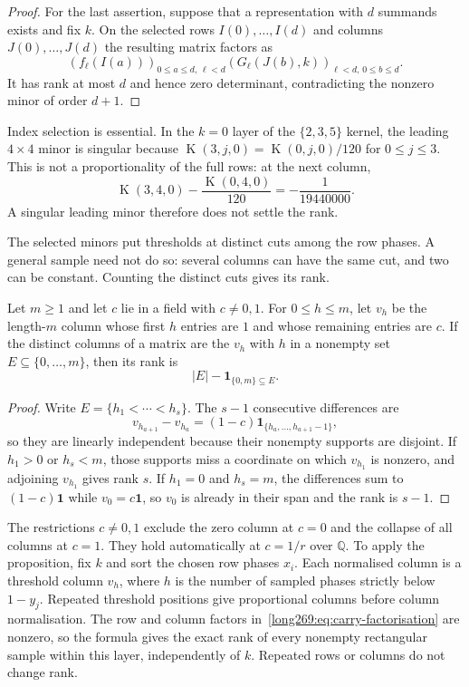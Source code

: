 \documentclass[11pt]{article}
\theoremstyle{remark}
\theoremstyle{plain}
\newcommand{\Kernel}{\operatorname{K}}
\begin{document}
\begin{proof}
For the last assertion, suppose that a representation with $d$ summands
exists and fix $k$.  On the selected rows $I(0),\ldots,I(d)$ and columns
$J(0),\ldots,J(d)$ the resulting matrix factors as
\[
 (f_\ell(I(a)))_{0\le a\le d,\,\ell<d}
 (G_\ell(J(b),k))_{\ell<d,\,0\le b\le d}.
\]
It has rank at most $d$ and hence zero determinant, contradicting the
nonzero minor of order $d+1$.
\end{proof}


Index selection is essential.  In the $k=0$ layer of the $\{2,3,5\}$
kernel, the leading $4\times4$ minor is singular because
$\Kernel(3,j,0)=\Kernel(0,j,0)/120$ for $0\le j\le3$.
This is not a proportionality of the full rows: at the next column,
\[
 \Kernel(3,4,0)-\frac{\Kernel(0,4,0)}{120}=-\frac1{19440000}.
\]
A singular leading minor therefore does not settle the rank.

The selected minors put thresholds at distinct cuts among the row phases. A general sample
need not do so: several columns can have the same cut, and two can be
constant. Counting the distinct cuts gives its rank.

\begin{proposition}\label{long269:res:finite-cut-rank}
Let $m\ge1$ and let $c$ lie in a field with $c\ne0,1$.  For $0\le h\le m$,
let $v_h$ be the length-$m$ column whose first $h$ entries are $1$ and whose
remaining entries are $c$.  If the distinct columns of a matrix are the
$v_h$ with $h$ in a nonempty set $E\subseteq\{0,\ldots,m\}$, then its rank is
\[
 |E|-\mathbf 1_{\{0,m\}\subseteq E}.
\]
\end{proposition}

\begin{proof}
Write $E=\{h_1<\cdots<h_s\}$.  The $s-1$ consecutive differences are
\[
 v_{h_{a+1}}-v_{h_a}
   =(1-c)\mathbf 1_{\{h_a,\ldots,h_{a+1}-1\}},
\]
so they are linearly independent because their nonempty supports are
disjoint.  If $h_1>0$ or $h_s<m$, those supports miss a coordinate on which
$v_{h_1}$ is nonzero, and adjoining $v_{h_1}$ gives rank $s$.  If
$h_1=0$ and $h_s=m$, the differences sum to $(1-c)\mathbf 1$ while
$v_0=c\mathbf 1$, so $v_0$ is already in their span and the rank is $s-1$.
\end{proof}

The restrictions $c\ne0,1$ exclude the zero column at $c=0$ and the
collapse of all columns at $c=1$.  They hold automatically at $c=1/r$ over
$\mathbb Q$.
To apply the proposition, fix $k$ and sort the chosen row phases $x_i$.
Each normalised column is a threshold column $v_h$, where $h$ is the
number of sampled phases strictly below $1-y_j$.  Repeated threshold
positions give proportional columns before column normalisation.
The row and column factors in~\eqref{long269:eq:carry-factorisation} are
nonzero, so the formula gives the exact rank of every nonempty rectangular
sample within this layer, independently of $k$.  Repeated rows or columns
do not change rank.
\end{document}
